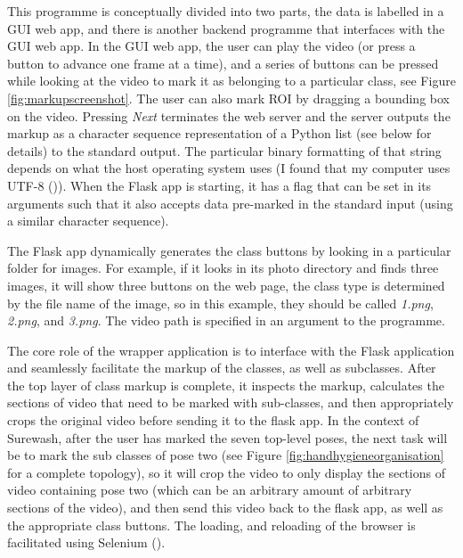     This programme is conceptually divided into two parts, the data is labelled in a GUI web app, and there is another backend programme that interfaces with the GUI web app. In the GUI web app, the user can play the video (or press a button to advance one frame at a time), and a series of buttons can be pressed while looking at the video to mark it as belonging to a particular class, see Figure \ref{fig:markupscreenshot}. The user can also mark ROI by dragging a bounding box on the video. Pressing {\slshape Next} terminates the web server and the server outputs the markup as a character sequence representation of a Python list (see below for details) to the standard output. The particular binary formatting of that string depends on what the host operating system uses (I found that my computer uses UTF-8 (\cite{yergeau1996utf})). When the Flask app is starting, it has a flag that can be set in its arguments such that it also accepts data pre-marked in the standard input (using a similar character sequence).

    The Flask app dynamically generates the class buttons by looking in a particular folder for images. For example, if it looks in its photo directory and finds three images, it will show three buttons on the web page, the class type is determined by the file name of the image, so in this example, they should be called {\slshape 1.png}, {\slshape 2.png}, and {\slshape 3.png}. The video path is specified in an argument to the programme.

    The core role of the wrapper application is to interface with the Flask application and seamlessly facilitate the markup of the classes, as well as subclasses. After the top layer of class markup is complete, it inspects the markup, calculates the sections of video that need to be marked with sub-classes, and then appropriately crops the original video before sending it to the flask app. In the context of Surewash, after the user has marked the seven top-level poses, the next task will be to mark the sub classes of pose two (see Figure \ref{fig:handhygieneorganisation} for a complete topology), so it will crop the video to only display the sections of video containing pose two (which can be an arbitrary amount of arbitrary sections of the video), and then send this video back to the flask app, as well as the appropriate class buttons. The loading, and reloading of the browser is facilitated using Selenium (\cite{selenium}).


